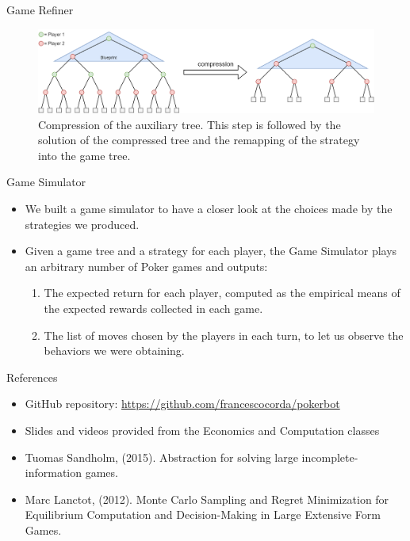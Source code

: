 \documentclass[11pt]{beamer}
\begin{document}
\begin{frame}{Game Refiner}
\begin{figure}[hbtp]
		\centering
		\includegraphics[scale=0.2]{images/img_06.png}
		\caption{Compression of the auxiliary tree. This step is followed by the solution of the compressed tree and the remapping of the strategy into the game tree.}
\end{figure}
\end{frame}

\begin{frame}{Game Simulator}
\begin{itemize}
\item We built a game simulator to have a closer look at the choices made by the strategies we produced.
\item Given a game tree and a strategy for each player, the Game Simulator plays an arbitrary number of Poker games and outputs:
\begin{enumerate}
\item The expected return for each player, computed as the empirical means of the expected rewards collected in each game.
\item The list of moves chosen by the players in each turn, to let us observe the behaviors we were obtaining.
\end{enumerate}
\end{itemize}
\end{frame}

\begin{frame}{References}
\begin{itemize}
\item GitHub repository: \url{https://github.com/francescocorda/pokerbot}
\item Slides and videos provided from the Economics and Computation classes
\item Tuomas Sandholm, (2015). Abstraction for solving large incomplete-information games.
\item Marc Lanctot, (2012). Monte Carlo Sampling and Regret Minimization for Equilibrium Computation and Decision-Making in Large Extensive Form Games.

\end{itemize}
\end{frame}
\end{document}
